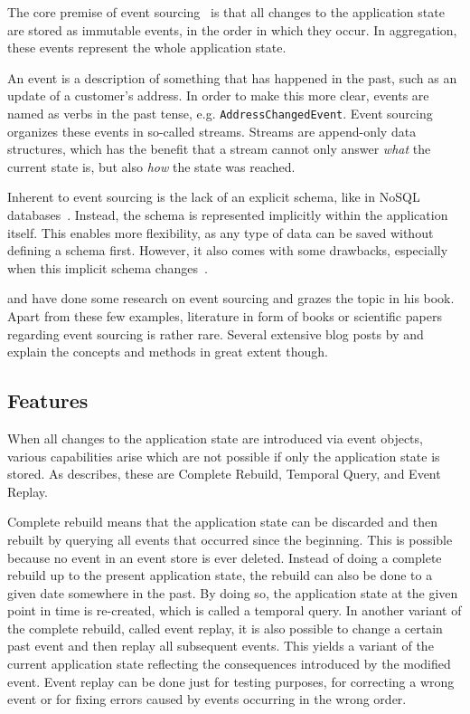 The core premise of event sourcing~\cite{WEB:Fowler:2005} is that all changes to the application state are stored as immutable events, in the order in which they occur.
In aggregation, these events represent the whole application state.

An event is a description of something that has happened in the past, such as an update of a customer's address.
In order to make this more clear, events are named as verbs in the past tense, e.g. \texttt{AddressChangedEvent}.
Event sourcing organizes these events in so-called streams.
Streams are append-only data structures, which has the benefit that a stream cannot only answer \emph{what} the current state is, but also \emph{how} the state was reached.

Inherent to event sourcing is the lack of an explicit schema, like in NoSQL databases~\cite{fowler2013schemaless}.
Instead, the schema is represented implicitly within the application itself.
This enables more flexibility, as any type of data can be saved without defining a schema first.
However, it also comes with some drawbacks, especially when this implicit schema changes~\cite{Overeem2017}.

\citet{Overeem2017} and \citet{Erb2016} have done some research on event sourcing and \citet{evans2004domain} grazes the topic in his book.
Apart from these few examples, literature in form of books or scientific papers regarding event sourcing is rather rare.
Several extensive blog posts by \citet{WEB:Fowler:2005} and \citet{young2010whyeventsourcing} explain the concepts and methods in great extent though.

\subsection{Features}

When all changes to the application state are introduced via event objects, various capabilities arise which are not possible if only the application state is stored.
As \citet{WEB:Fowler:2005} describes, these are Complete Rebuild, Temporal Query, and Event Replay.

Complete rebuild means that the application state can be discarded and then rebuilt by querying all events that occurred since the beginning.
This is possible because no event in an event store is ever deleted.
Instead of doing a complete rebuild up to the present application state, the rebuild can also be done to a given date somewhere in the past.
By doing so, the application state at the given point in time is re-created, which is called a temporal query.
In another variant of the complete rebuild, called event replay, it is also possible to change a certain past event and then replay all subsequent events.
This yields a variant of the current application state reflecting the consequences introduced by the modified event.
Event replay can be done just for testing purposes, for correcting a wrong event or for fixing errors caused by events occurring in the wrong order.

